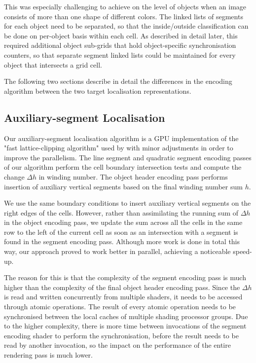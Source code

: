 \documentclass[11pt,a4paper,twoside]{article}
\begin{document}
This was especially challenging to achieve on the level of objects when an image consists of more than one shape of different colors. The linked lists of segments for each object need to be separated, so that the inside/outside classification can be done on per-object basis within each cell. As described in detail later, this required additional object sub-grids that hold object-specific synchronisation counters, so that separate segment linked lists could be maintained for every object that intersects a grid cell.

The following two sections describe in detail the differences in the encoding algorithm between the two target localisation representations.

\subsection{Auxiliary-segment Localisation}

Our auxiliary-segment localisation algorithm is a GPU implementation of the "fast lattice-clipping algorithm" used by \cite{NehabHoppe08} with minor adjustments in order to improve the parallelism. The line segment and quadratic segment encoding passes of our algorithm perform the cell boundary intersection tests and compute the change  $\Delta{h}$ in winding number. The object header encoding pass performs insertion of auxiliary vertical segments based on the final winding number sum $h$.

We use the same boundary conditions to insert auxiliary vertical segments on the right edges of the cells. However, rather than assimilating the running sum of $\Delta{h}$ in the object encoding pass, we update the sum across all the cells in the same row to the left of the current cell as soon as an intersection with a segment is found in the segment encoding pass. Although more work is done in total this way, our approach proved to work better in parallel, achieving a noticeable speed-up.

The reason for this is that the complexity of the segment encoding pass is much higher than the complexity of the final object header encoding pass. Since the $\Delta{h}$ is read and written concurrently from multiple shaders, it needs to be accessed through atomic operations. The result of every atomic operation needs to be synchronised between the local caches of multiple shading processor groups. Due to the higher complexity, there is more time between invocations of the segment encoding shader to perform the synchronisation, before the result needs to be read by another invocation, so the impact on the performance of the entire rendering pass is much lower.
\end{document}
